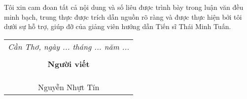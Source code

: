 \documentclass[./thesis.tex]{subfiles}
\begin{document}
{\fontsize{13}{12} \selectfont
Tôi xin cam đoan tất cả nội dung và số liêu được trình bày trong luận văn đều minh bạch, trung thực được trích dẫn nguồn rõ ràng và được thực hiện bởi tôi dưới sự hỗ trợ, giúp đỡ của giảng viên hướng dẫn Tiến sĩ Thái Minh Tuấn.}


{\fontsize{13}{12} \selectfont
\hspace*{\fill}
\begin{tabular}{@{}c@{}} 

\\ \textit{Cần Thơ, ngày ... tháng ... năm ... } \\ \\
\textbf{Người viết}\\ \\
\\
\\
Nguyễn Nhựt Tín
\end{tabular}}
\end{document}
